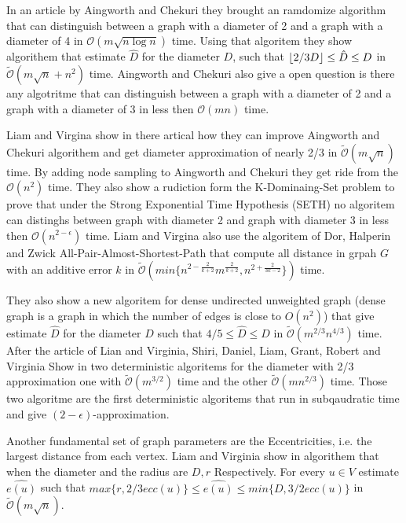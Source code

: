 In an article by Aingworth and Chekuri
\cite{siam1999} they brought an ramdomize algorithm that can distinguish between a graph with a diameter of 2 and a graph with a diameter of 4 in $\mathcal{O}(m \sqrt{n\log n})$ time.
Using that algoritem they show algorithem that estimate $\hat{D}$ for the diameter $D$, such that $\lfloor2/3D\rfloor \leq \hat{D} \leq D$ in $\mathcal{\tilde{O}}(m\sqrt{n}+n^2)$ time. Aingworth and Chekuri also give a open question is there any algotritme that can distinguish between a graph with a diameter of 2 and a graph with a diameter of 3 in less then $\mathcal{O}(mn)$ time.

Liam and Virgina \cite{LV2013} show in there artical how they can improve Aingworth and Chekuri algorithem and get diameter approximation of nearly 2/3 in $\mathcal{\tilde{O}}(m\sqrt{n})$ time.
By adding node sampling to Aingworth and Chekuri they get ride from the $\mathcal{O}(n^2)$ time.
They also show a rudiction form the K-Dominaing-Set problem to prove that under the Strong Exponential Time
Hypothesis (SETH) no algoritem can distinghs between graph with diameter 2 and graph with diameter 3 in less then $\mathcal{O}(n^{2-\epsilon})$ time.
Liam and Virgina also use the algoritem of Dor, Halperin and Zwick \cite{DHZ2000} All-Pair-Almost-Shortest-Path that compute all distance in grpah $G$ with an additive error $k$ in $\mathcal{\tilde{O}}(min\{n^{2-\frac{2}{k+2}}m^{\frac{2}{k+2}},n^{2+\frac{2}{3k-2}}\})$ time.

They also show a new algoritem for dense undirected unweighted graph (dense graph is a graph in which the number of edges is close to $O(n^2)$) that give estimate $\hat{D}$ for the diameter $D$ such that $4/5 \leq \hat{D} \leq D$ in $\mathcal{\tilde{O}}(m^{2/3}n^{4/3})$ time.    
After the article of Lian and Virginia, Shiri, Daniel, Liam, Grant, Robert and Virginia 
Show in \cite{SDLLGREV2000} two deterministic algoritems for the diameter with 2/3 approximation one with $\mathcal{\tilde{O}}(m^{3/2})$ time and the other $\mathcal{\tilde{O}}(mn^{2/3})$ time.
Those two algoritme are the first deterministic algoritems that run in subqaudratic time and give $(2-\epsilon)$-approximation.

Another fundamental set of graph parameters are the Eccentricities, i.e. the largest distance from each vertex. 
Liam and Virginia show in \cite{LV2013} algorithem that when the diameter and the radius are $D,r$ Respectively. For every $u \in V$ estimate $\hat{e(u)}$ such that $max\{r,2/3ecc(u)\} \leq \hat{e(u)} \leq min\{D,3/2ecc(u)\}$ in $\mathcal{\tilde{O}}(m\sqrt{n})$.


